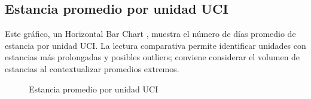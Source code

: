 \subsection{Estancia promedio por unidad UCI}
Este gráfico, un Horizontal Bar Chart \cite{hbarchart}, muestra el número de días promedio de estancia por unidad UCI. La lectura comparativa permite identificar unidades con estancias más prolongadas y posibles outliers; conviene considerar el volumen de estancias al contextualizar promedios extremos.
\begin{figure}[H]
  \centering
  \caption{Estancia promedio por unidad UCI}
  \label{fig:chart-icu}
\end{figure}

